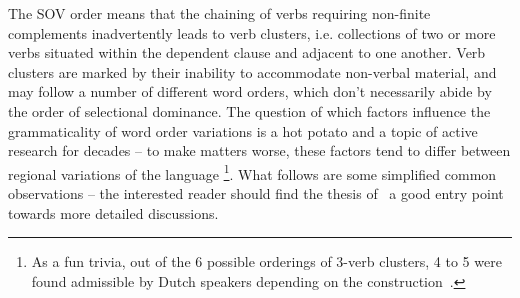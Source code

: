 The SOV order means that the chaining of verbs requiring non-finite complements inadvertently leads to verb clusters, i.e. collections of two or more verbs situated within the dependent clause and adjacent to one another.
Verb clusters are marked by their inability to accommodate non-verbal material, and may follow a number of different word orders, which don't necessarily abide by the order of selectional dominance.
The question of which factors influence the grammaticality of word order variations  is a hot potato and a topic of active research for decades -- to make matters worse, these factors tend to differ between regional variations of the language%
	\footnote{As a fun trivia,  out of the 6 possible orderings of 3-verb clusters, 4 to 5 were found admissible by Dutch speakers depending on the construction~\cite{3vc}.}.
What follows are some simplified common observations -- the interested reader should find the thesis of~\citet{augustinus2015complement} a good entry point towards more detailed discussions.

